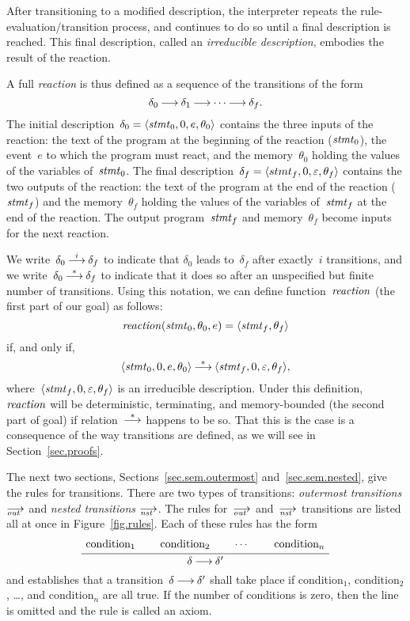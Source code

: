 After transitioning to a modified description, the interpreter repeats the
rule-evaluation/transition process, and continues to do so until a final
description is reached.  This final description, called an \emph{irreducible
  description}, embodies the result of the reaction.

A full \emph{reaction} is thus defined as a sequence of the transitions of
the form
\[
  \delta_0\trans\delta_1\trans\cdots\trans\delta_f.
\]
The initial description~$\delta_0=\<\stmt_0,0,e,\theta_0>$ contains the
three inputs of the reaction: the text of the program at the beginning of
the reaction ($\mathit{stmt}_0$), the event~$e$ to which the program must react, and
the memory~$\theta_0$ holding the values of the variables of~$\mathit{stmt}_0$.  The
final description~$\delta_f=\<stmt_f,0,\nil,\theta_f>$ contains the two
outputs of the reaction: the text of the program at the end of the reaction
($\mathit{stmt}_f$) and the memory~$\theta_f$ holding the values of the variables
of~$\mathit{stmt}_f$ at the end of the reaction.  The output program~$\mathit{stmt}_f$ and
memory~$\theta_f$ become inputs for the next reaction.

We write~$\delta_0\trans[i]\delta_f$ to indicate that $\delta_0$ leads
to~$\delta_f$ after exactly~$i$ transitions, and we
write~$\delta_0\trans[*]\delta_f$ to indicate that it does so after an
unspecified but finite number of transitions.  Using this notation, we can
define function~$\mathop{\mathit{reaction}}$ (the first part of our goal) as follows:
\[
  \reaction(\stmt_0,\theta_0,e)=\<\stmt_f,\theta_f>
\]
if, and only if,
\[
  \<\stmt_0,0,e,\theta_0>\trans[*]\<\stmt_f,0,\nil,\theta_f>,
\]
where~$\<\stmt_f,0,\nil,\theta_f>$ is an irreducible description.  Under
this definition, $\mathop{\mathit{reaction}}$ will be deterministic, terminating, and
memory-bounded (the second part of goal) if relation~$\trans[*]$ happens to
be so.  That this is the case is a consequence of the way transitions are
defined, as we will see in Section~\ref{sec.proofs}.

The next two sections, Sections~\ref{sec.sem.outermost}
and~\ref{sec.sem.nested}, give the rules for transitions.  There are two
types of transitions: \emph{outermost transitions} $\out$ and \emph{nested
  transitions} $\nst$.  The rules for~$\out$ and~$\nst$ transitions are
listed all at once in Figure~\ref{fig.rules}.  Each of these rules has the
form
\[
  \AxiomC{\strut condition$_1$}
  \AxiomC{\strut condition$_2$}
  \AxiomC{$\cdots$}
  \AxiomC{\strut condition$_n$}
  \QuaternaryInfC{$\delta\trans\delta'$}
  \DisplayProof
\]
and establishes that a transition~$\delta\trans\delta'$ shall take place if
condition$_1$, condition$_2$, \dots, and condition$_n$ are all true.  If the
number of conditions is zero, then the line is omitted and the rule is
called an axiom.

